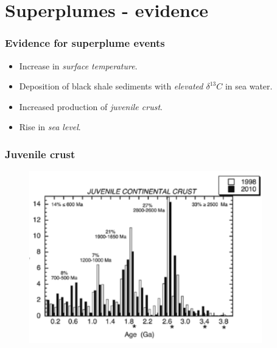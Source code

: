 \documentclass{beamer}
\begin{document}
        \section{Superplumes - evidence}

        \begin{frame}
        \frametitle{Evidence for superplume events}
        \begin{itemize}
                \item Increase in \emph{surface temperature}.
                \item Deposition of black shale sediments with \emph{elevated $\delta^{13}C$} in sea water.
                \item Increased production of \emph{juvenile crust}.
                \item Rise in \emph{sea level}.
        \end{itemize}
        \end{frame}

        \begin{frame}
        \frametitle{Juvenile crust}
        \begin{figure}
        \begin{center}
                \includegraphics[width=0.9\textwidth]{juvenile.png}
        \end{center}
        \end{figure}
        \end{frame}
        
\end{document}
